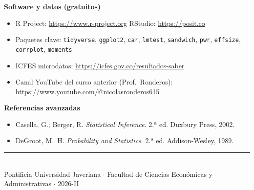 \documentclass[11pt, a4paper]{article}
\begin{document}
\begin{sloppypar}
\textbf{Software y datos (gratuitos)}
\begin{itemize}
  \item R Project: \url{https://www.r-project.org} \quad RStudio: \url{https://posit.co}
  \item Paquetes clave: \texttt{tidyverse}, \texttt{ggplot2}, \texttt{car},
        \texttt{lmtest}, \texttt{sandwich}, \texttt{pwr}, \texttt{effsize},
        \texttt{corrplot}, \texttt{moments}
  \item ICFES microdatos: \url{https://icfes.gov.co/resultados-saber}
  \item Canal YouTube del curso anterior (Prof.\ Ronderos):
        \url{https://www.youtube.com/@nicolasronderos615}
\end{itemize}
\end{sloppypar}

\textbf{Referencias avanzadas}
\begin{itemize}
  \item Casella, G.; Berger, R. \textit{Statistical Inference}. 2.ª ed. Duxbury Press, 2002.
  \item DeGroot, M.\ H. \textit{Probability and Statistics}. 2.ª ed. Addison-Wesley, 1989.
\end{itemize}

\vspace{16pt}
\begin{center}
\rule{0.5\linewidth}{0.4pt}\\[4pt]
{\small Pontificia Universidad Javeriana $\cdot$
  Facultad de Ciencias Econ\'omicas y Administrativas $\cdot$ 2026-II}
\end{center}
\end{document}
